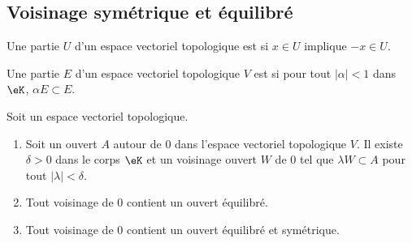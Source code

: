 \subsection{Voisinage symétrique et équilibré}

\begin{definition}
    Une partie \( U\) d'un espace vectoriel topologique est  si \( x\in U\) implique \( -x\in U\).
\end{definition}

\begin{definition}
    Une partie \( E\) d'un espace vectoriel topologique \( V\) est  si pour tout \( | \alpha |<1\) dans \( \eK\), \( \alpha E\subset E\).
\end{definition}

\begin{lemma}     \label{LEMooYSWXooNqAcOQ}
    Soit un espace vectoriel topologique.
    \begin{enumerate}
        \item       \label{ITEMooSWWQooTreWIE}
            Soit un ouvert \( A\) autour de \( 0\) dans l'espace vectoriel topologique \( V\). Il existe \( \delta>0\) dans le corps \( \eK\) et un voisinage ouvert \(W\) de \( 0\) tel que \( \lambda W\subset A\) pour tout \( | \lambda |<\delta\).
        \item       \label{ITEMooXZNHooGVplpu}
            Tout voisinage de \( 0\) contient un ouvert équilibré.
        \item       \label{ITEMooRLVSooGihcLc}
            Tout voisinage de \( 0\) contient un ouvert équilibré et symétrique.
    \end{enumerate}
\end{lemma}

